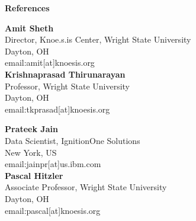 \documentclass[letterpaper,11pt]{article}
\newcommand{\resheading}[1]{{\large \colorbox{mygrey}{\begin{minipage}{\textwidth}{\textbf{#1 \vphantom{p\^{E}}}}\end{minipage}}}}
\begin{document}
\resheading{References}

\begin{multicols}{2}
\textbf{\large Amit Sheth}\\
Director, Knoe.s.is Center, Wright State University\\
Dayton, OH \\
email:amit[at]knoesis.org\\
\columnbreak
\textbf{\large Krishnaprasad Thirunarayan}\\
Professor, Wright State University\\
Dayton, OH \\
email:tkprasad[at]knoesis.org\\
\end{multicols}

\begin{multicols}{2}
\textbf{\large Prateek Jain}\\
Data Scientist, IgnitionOne Solutions\\
New York, US\\
email:jainpr[at]us.ibm.com\\
\columnbreak
\textbf{\large Pascal Hitzler}\\
Associate Professor, Wright State University\\
Dayton, OH \\ 
email:pascal[at]knoesis.org\\
\end{multicols}


\end{document}
